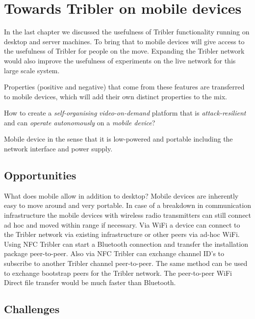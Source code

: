 \chapter{Towards Tribler on mobile devices}

In the last chapter we discussed the usefulness of Tribler functionality running on desktop and server machines.
To bring that to mobile devices will give access to the usefulness of Tribler for people on the move.
Expanding the Tribler network would also improve the usefulness of experiments on the live network for this large scale system.

Properties (positive and negative) that come from these features are transferred to mobile devices, which will add their own distinct properties to the mix.


How to create a \emph{self-organising} \emph{video-on-demand} platform that is \emph{attack-resilient} and can \emph{operate autonomously} on a \emph{mobile device}?

Mobile device in the sense that it is low-powered and portable including the network interface and power supply.



\section{Opportunities}

What does mobile allow in addition to desktop?
Mobile devices are inherently easy to move around and very portable.
In case of a breakdown in communication infrastructure the mobile devices with wireless radio transmitters can still connect ad hoc and moved within range if necessary.
Via WiFi a device can connect to the Tribler network via existing infrastructure or other peers via ad-hoc WiFi.
Using NFC Tribler can start a Bluetooth connection and transfer the installation package peer-to-peer.
Also via NFC Tribler can exchange channel ID's to subscribe to another Tribler channel peer-to-peer.
The same method can be used to exchange bootstrap peers for the Tribler network.
The peer-to-peer WiFi Direct file transfer would be much faster than Bluetooth.


\section{Challenges}

